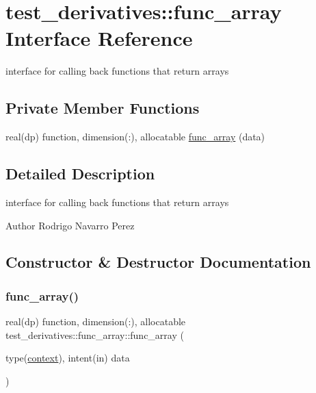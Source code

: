 \hypertarget{interfacetest__derivatives_1_1func__array}{}\section{test\+\_\+derivatives\+:\+:func\+\_\+array Interface Reference}
\label{interfacetest__derivatives_1_1func__array}


interface for calling back functions that return arrays  


\subsection*{Private Member Functions}
\begin{DoxyCompactItemize}
\item 
real(dp) function, dimension(\+:), allocatable \hyperlink{interfacetest__derivatives_1_1func__array_af10fbd94cfa34a97ef95892e6a146106}{func\+\_\+array} (data)
\end{DoxyCompactItemize}


\subsection{Detailed Description}
interface for calling back functions that return arrays 

\begin{DoxyAuthor}{Author}
Rodrigo Navarro Perez 
\end{DoxyAuthor}


\subsection{Constructor \& Destructor Documentation}
\mbox{\label{interfacetest__derivatives_1_1func__array_af10fbd94cfa34a97ef95892e6a146106}} 
\subsubsection{\texorpdfstring{func\+\_\+array()}{func\_array()}}
{\footnotesize\ttfamily real(dp) function, dimension(\+:), allocatable test\+\_\+derivatives\+::func\+\_\+array\+::func\+\_\+array (\begin{DoxyParamCaption}\item[{type(\hyperlink{structnum__recipes_1_1context}{context}), intent(in)}]{data }\end{DoxyParamCaption})\hspace{0.3cm}{\ttfamily [private]}}


